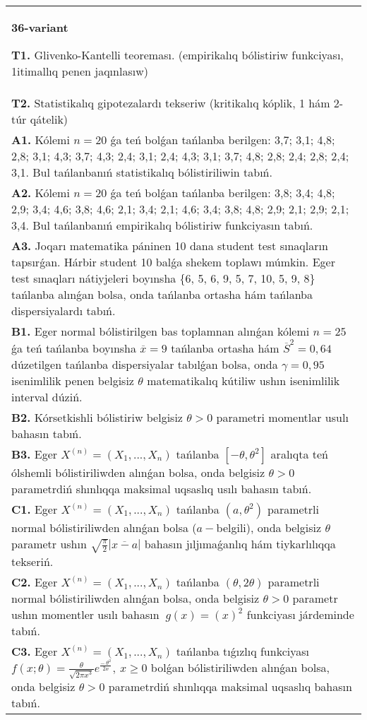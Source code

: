 \documentclass{article}
\begin{document}
\begin{tabular}{m{17cm}}
\textbf{36-variant}
\newline

\textbf{T1.} 
Glivenko-Kantelli teoreması. (empirikalıq bólistiriw funkciyası, 1itimallıq penen jaqınlasıw)
 \\
\textbf{T2.} 
Statistikalıq gipotezalardı tekseriw (kritikalıq kóplik, 1 hám 2-túr qátelik)
 \\
\textbf{A1.} 
Kólemi \(n = 20\) ǵa teń bolǵan tańlanba berilgen: 3,7; 3,1; 4,8; 2,8; 3,1; 4,3; 3,7; 4,3; 2,4; 3,1; 2,4; 4,3; 3,1; 3,7; 4,8; 2,8; 2,4; 2,8; 2,4; 3,1. Bul tańlanbanıń statistikalıq bólistiriliwin tabıń.
 \\
\textbf{A2.} 
Kólemi \(n = 20\) ǵa teń bolǵan tańlanba berilgen: 3,8; 3,4; 4,8; 2,9; 3,4; 4,6; 3,8; 4,6; 2,1; 3,4; 2,1; 4,6; 3,4; 3,8; 4,8; 2,9; 2,1; 2,9; 2,1; 3,4. Bul tańlanbanıń empirikalıq bólistiriw funkciyasın tabıń.
 \\
\textbf{A3.} 
Joqarı matematika páninen 10 dana student test sınaqların tapsırǵan. Hárbir student 10 balǵa shekem toplawı múmkin. Eger test sınaqları nátiyjeleri boyınsha \{6, 5, 6, 9, 5, 7, 10, 5, 9, 8\} tańlanba alınǵan bolsa, onda tańlanba ortasha hám tańlanba dispersiyalardı tabıń.
 \\
\textbf{B1.} 
Eger normal bólistirilgen bas toplamnan alınǵan kólemi \(n = 25\) ǵa teń tańlanba boyınsha \(\overline{x} = 9\) tańlanba ortasha hám \({\overline{S}}^{2} = 0,64\) dúzetilgen tańlanba dispersiyalar tabılǵan bolsa, onda \(\gamma = 0,95\) isenimlilik penen belgisiz \(\theta\) matematikalıq kútiliw ushın isenimlilik interval dúziń.
 \\
\textbf{B2.} 
Kórsetkishli bólistiriw belgisiz \(\theta > 0\) parametri momentlar usulı bahasın tabıń.
 \\
\textbf{B3.} 
Eger \(X^{(n)} = \left( X_{1},...,X_{n} \right)\) tańlanba \(\left\lbrack - \theta,\theta^{2} \right\rbrack\) aralıqta teń ólshemli bólistiriliwden alınǵan bolsa, onda belgisiz \(\theta > 0\) parametrdiń shınlıqqa maksimal uqsaslıq usılı bahasın tabıń.
 \\
\textbf{C1.} 
Eger \(X^{(n)} = \left( X_{1},...,X_{n} \right)\) tańlanba \(\left( a,\theta^{2} \right)\) parametrli normal bólistiriliwden alınǵan bolsa (\(a -\)belgili), onda belgisiz \(\theta\) parametr ushın \(\sqrt{\frac{\pi}{2}}\left| \overline{x - a} \right|\) bahasın jıljımaǵanlıq hám tiykarlılıqqa tekseriń.
 \\
\textbf{C2.} 
Eger \(X^{(n)} = \left( X_{1},...,X_{n} \right)\) tańlanba \((\theta,2\theta)\) parametrli normal bólistiriliwden alınǵan bolsa, onda belgisiz \(\theta > 0\) parametr ushın momentler usılı bahasın \({\ g(x) = (x)}^{2}\) funkciyası járdeminde tabıń.
 \\
\textbf{C3.} 
Eger \(X^{(n)} = \left( X_{1},...,X_{n} \right)\) tańlanba tıǵızlıq funkciyası
$f(x;\theta) = \frac{\theta}{\sqrt{2\pi x^{3}}}e^{\frac{- \ \theta^{2}}{2x}},\ x \geq 0$
bolǵan bólistiriliwden alınǵan bolsa, onda belgisiz \(\theta > 0\) parametrdiń shınlıqqa maksimal uqsaslıq bahasın tabıń.
 \\

\end{tabular}
\vspace{1cm}
\end{document}
